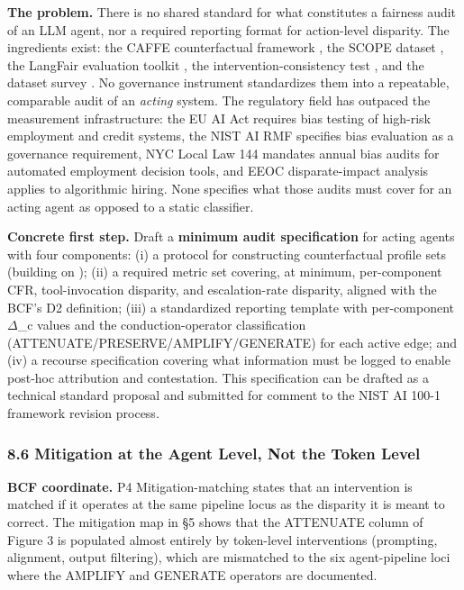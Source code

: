 \documentclass[10pt]{article}
\begin{document}
\textbf{The problem.} There is no shared standard for what constitutes a fairness audit of an LLM agent, nor a required reporting format for action-level disparity. The ingredients exist: the CAFFE counterfactual framework \cite{parziale2025systematic}, the SCOPE dataset \cite{parziale2026scope}, the LangFair evaluation toolkit \cite{bouchard2024bring}, the intervention-consistency test \cite{basu2026names}, and the dataset survey \cite{zhang2025datasets}. No governance instrument standardizes them into a repeatable, comparable audit of an \emph{acting} system. The regulatory field has outpaced the measurement infrastructure: the EU AI Act \cite{parliament2024regulation} requires bias testing of high-risk employment and credit systems, the NIST AI RMF \cite{nist2023artificial} specifies bias evaluation as a governance requirement, NYC Local Law 144 mandates annual bias audits for automated employment decision tools, and EEOC disparate-impact analysis applies to algorithmic hiring. None specifies what those audits must cover for an acting agent as opposed to a static classifier.

\textbf{Concrete first step.} Draft a \textbf{minimum audit specification} for acting agents with four components: (i) a protocol for constructing counterfactual profile sets (building on \cite{parziale2025systematic}); (ii) a required metric set covering, at minimum, per-component CFR, tool-invocation disparity, and escalation-rate disparity, aligned with the BCF's D2 definition; (iii) a standardized reporting template with per-component $\Delta$\_c values and the conduction-operator classification (ATTENUATE/PRESERVE/AMPLIFY/GENERATE) for each active edge; and (iv) a recourse specification covering what information must be logged to enable post-hoc attribution and contestation. This specification can be drafted as a technical standard proposal and submitted for comment to the NIST AI 100-1 framework revision process.

\subsubsection*{8.6 Mitigation at the Agent Level, Not the Token Level}

\textbf{BCF coordinate.} P4 Mitigation-matching states that an intervention is matched if it operates at the same pipeline locus as the disparity it is meant to correct. The mitigation map in \S{}5 shows that the ATTENUATE column of Figure 3 is populated almost entirely by token-level interventions (prompting, alignment, output filtering), which are mismatched to the six agent-pipeline loci where the AMPLIFY and GENERATE operators are documented.
\end{document}

